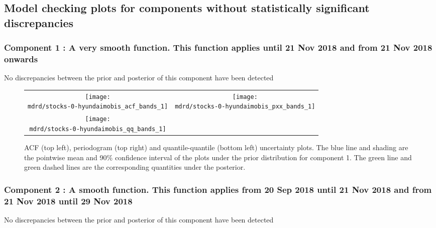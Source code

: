 \documentclass{article} %
\begin{document}
\subsection{Model checking plots for components without statistically significant discrepancies}

\subsubsection{Component 1 : A very smooth function. This function applies until 21 Nov 2018 and from 21 Nov 2018 onwards}

No discrepancies between the prior and posterior of this component have been detected

\begin{figure}[H]
\newcommand{\wmgd}{0.5\columnwidth}
\newcommand{\hmgd}{3.0cm}
\newcommand{\mdrd}{stocks-0-hyundaimobis}
\newcommand{\mbm}{\hspace{-0.3cm}}
\begin{tabular}{cc}
\mbm \texttt{[image: \\mdrd/stocks-0-hyundaimobis\_acf\_bands\_1]} & \texttt{[image: \\mdrd/stocks-0-hyundaimobis\_pxx\_bands\_1]} \\
\mbm \texttt{[image: \\mdrd/stocks-0-hyundaimobis\_qq\_bands\_1]}
\end{tabular}
\caption{
ACF (top left), periodogram (top right) and quantile-quantile (bottom left) uncertainty plots.
The blue line and shading are the pointwise mean and 90\% confidence interval of the plots under the prior distribution for component 1.
The green line and green dashed lines are the corresponding quantities under the posterior.}
\label{fig:check1}
\end{figure}

\subsubsection{Component 2 : A smooth function. This function applies from 20 Sep 2018 until 21 Nov 2018 and from 21 Nov 2018 until 29 Nov 2018}

No discrepancies between the prior and posterior of this component have been detected
\end{document}
